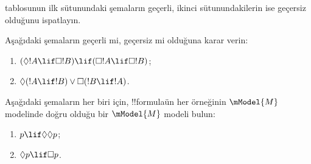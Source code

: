 \documentclass[../../../include/open-logic-section]{subfiles}
\begin{document}
\begin{prob}%
   tablosunun ilk
  sütunundaki şemaların geçerli, ikinci sütunundakilerin ise geçersiz
  olduğunu ispatlayın.
\end{prob}

\begin{prob}
  Aşağıdaki şemaların geçerli mi, geçersiz mi olduğuna karar verin:
  \begin{enumerate}
  \item $(\Diamond !A \lif \Box !B) \lif (\Box !A \lif \Box
    !B)$;
  \item $\Diamond(!A \lif !B) \lor \Box(!B \lif !A)$.
  \end{enumerate}
\end{prob}

\begin{prob}
  Aşağıdaki şemaların her biri için, !!{formula}{}ün her örneğinin
  $\mModel{M}$ modelinde doğru olduğu bir $\mModel{M}$ modeli bulun:
  \begin{enumerate}
  \item $p \lif \Diamond\Diamond p$;
  \item $\Diamond p \lif \Box p$.
  \end{enumerate}
\end{prob}
\end{document}
